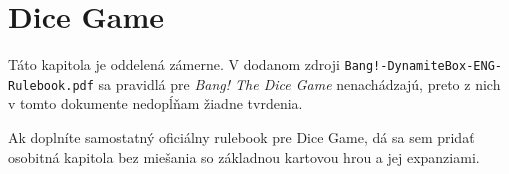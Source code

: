 \chapter{Dice Game}

Táto kapitola je oddelená zámerne. V dodanom zdroji \texttt{Bang!-DynamiteBox-ENG-Rulebook.pdf} sa pravidlá pre \emph{Bang! The Dice Game} nenachádzajú, preto z nich v tomto dokumente nedopĺňam žiadne tvrdenia.

Ak doplníte samostatný oficiálny rulebook pre Dice Game, dá sa sem pridať osobitná kapitola bez miešania so základnou kartovou hrou a jej expanziami.
